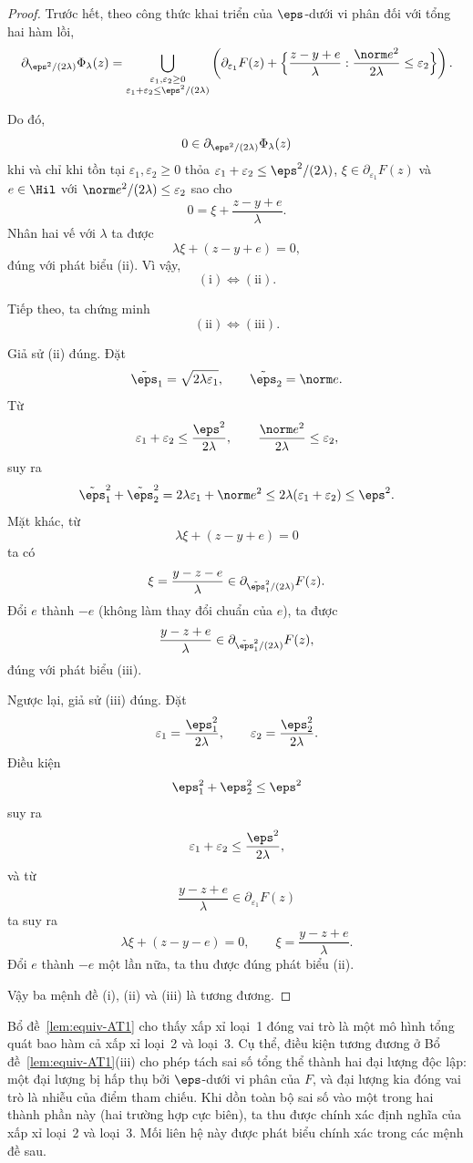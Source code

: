 \begin{proof}
Trước hết, theo công thức khai triển của $\eps$-dưới vi phân đối với tổng
hai hàm lồi,
\[
\partial_{\eps^2/(2\lambda)}\Phi_\lambda(z)
=
\bigcup_{\substack{\varepsilon_1,\varepsilon_2\ge0\\
\varepsilon_1+\varepsilon_2\le\eps^2/(2\lambda)}}
\left(
\partial_{\varepsilon_1}F(z)
+
\Bigl\{
\frac{z-y+e}{\lambda}:
\frac{\norm e^2}{2\lambda}\le\varepsilon_2
\Bigr\}
\right).
\]

Do đó,
\[
0\in\partial_{\eps^2/(2\lambda)}\Phi_\lambda(z)
\]
khi và chỉ khi tồn tại
$\varepsilon_1,\varepsilon_2\ge0$ thỏa
$\varepsilon_1+\varepsilon_2\le\eps^2/(2\lambda)$,
$\xi\in\partial_{\varepsilon_1}F(z)$ và
$e\in\Hil$ với
$\norm e^2/(2\lambda)\le\varepsilon_2$ sao cho
\[
0
=
\xi+\frac{z-y+e}{\lambda}.
\]
Nhân hai vế với $\lambda$ ta được
\[
\lambda\xi+(z-y+e)=0,
\]
đúng với phát biểu (ii). Vì vậy,
\[
\mathrm{(i)}
\Longleftrightarrow
\mathrm{(ii)}.
\]

Tiếp theo, ta chứng minh
\[
\mathrm{(ii)}
\Longleftrightarrow
\mathrm{(iii)}.
\]

Giả sử (ii) đúng. Đặt
\[
\tilde\eps_1=\sqrt{2\lambda\varepsilon_1},
\qquad
\tilde\eps_2=\norm e.
\]
Từ
\[
\varepsilon_1+\varepsilon_2
\le
\frac{\eps^2}{2\lambda},
\qquad
\frac{\norm e^2}{2\lambda}
\le
\varepsilon_2,
\]
suy ra
\[
\tilde\eps_1^2+\tilde\eps_2^2
=
2\lambda\varepsilon_1+\norm e^2
\le
2\lambda(\varepsilon_1+\varepsilon_2)
\le
\eps^2.
\]
Mặt khác, từ
\[
\lambda\xi+(z-y+e)=0
\]
ta có
\[
\xi
=
\frac{y-z-e}{\lambda}
\in
\partial_{\tilde\eps_1^2/(2\lambda)}F(z).
\]
Đổi $e$ thành $-e$ (không làm thay đổi chuẩn của $e$), ta được
\[
\frac{y-z+e}{\lambda}
\in
\partial_{\tilde\eps_1^2/(2\lambda)}F(z),
\]
đúng với phát biểu (iii).

Ngược lại, giả sử (iii) đúng. Đặt
\[
\varepsilon_1=\frac{\eps_1^2}{2\lambda},
\qquad
\varepsilon_2=\frac{\eps_2^2}{2\lambda}.
\]
Điều kiện
\[
\eps_1^2+\eps_2^2\le\eps^2
\]
suy ra
\[
\varepsilon_1+\varepsilon_2
\le
\frac{\eps^2}{2\lambda},
\]
và từ
\[
\frac{y-z+e}{\lambda}
\in
\partial_{\varepsilon_1}F(z)
\]
ta suy ra
\[
\lambda\xi+(z-y-e)=0,
\qquad
\xi=\frac{y-z+e}{\lambda}.
\]
Đổi $e$ thành $-e$ một lần nữa, ta thu được đúng phát biểu (ii).

Vậy ba mệnh đề (i), (ii) và (iii) là tương đương.
\end{proof}

Bổ đề~\ref{lem:equiv-AT1} cho thấy xấp xỉ loại~1 đóng vai trò là một mô hình tổng quát bao hàm cả xấp xỉ loại~2 và loại~3. Cụ thể, điều kiện tương đương ở Bổ đề~\ref{lem:equiv-AT1}(iii) cho phép tách sai số tổng thể thành hai đại lượng độc lập: một đại lượng bị hấp thụ bởi $\eps$-dưới vi phân của $F$, và đại lượng kia đóng vai trò là nhiễu của điểm tham chiếu. Khi dồn toàn bộ sai số vào một trong hai thành phần này (hai trường hợp cực biên), ta thu được chính xác định nghĩa của xấp xỉ loại~2 và loại~3. Mối liên hệ này được phát biểu chính xác trong các mệnh đề sau.

